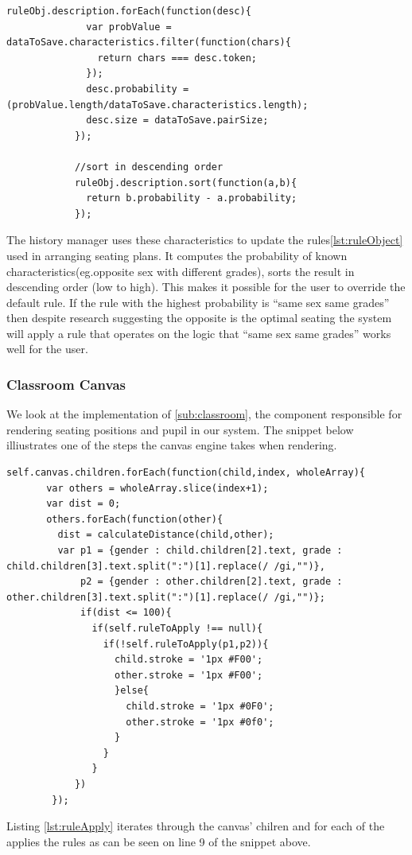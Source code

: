 \begin{lstlisting}[caption={Updates user model with the new rule}, label={lst:updateRule}]
    ruleObj.description.forEach(function(desc){
              var probValue = dataToSave.characteristics.filter(function(chars){
                return chars === desc.token;
              });
              desc.probability = (probValue.length/dataToSave.characteristics.length);
              desc.size = dataToSave.pairSize;
            });

            //sort in descending order
            ruleObj.description.sort(function(a,b){
              return b.probability - a.probability;
            });
\end{lstlisting}
The history manager uses these characteristics to update the rules\ref{lst:ruleObject} used in arranging seating plans. It computes the probability of known characteristics(eg.opposite sex with different grades), sorts the result in descending order (low to high). This makes it possible for the user to override the default rule. If the rule with the highest probability is ``same sex same grades'' then despite research suggesting the opposite is the optimal seating the system will apply a rule that operates on the logic that ``same sex same grades'' works well for the user. 

\subsubsection{Classroom Canvas} \label{sub:classroomCanvas}
We look at the implementation of \ref{sub:classroom}, the component responsible for rendering seating positions and pupil in our system. The snippet below illiustrates one of the steps the canvas engine takes when rendering. 
\begin{lstlisting}[caption={Applies seating rules to individual pupil}, label={lst:ruleApply}]
    self.canvas.children.forEach(function(child,index, wholeArray){
       var others = wholeArray.slice(index+1);
       var dist = 0;
       others.forEach(function(other){
         dist = calculateDistance(child,other);
         var p1 = {gender : child.children[2].text, grade : child.children[3].text.split(":")[1].replace(/ /gi,"")},
             p2 = {gender : other.children[2].text, grade : other.children[3].text.split(":")[1].replace(/ /gi,"")};
             if(dist <= 100){
               if(self.ruleToApply !== null){
                 if(!self.ruleToApply(p1,p2)){
                   child.stroke = '1px #F00';
                   other.stroke = '1px #F00';
                   }else{
                     child.stroke = '1px #0F0';
                     other.stroke = '1px #0f0';
                   }
                 }
               }
            })
        });
\end{lstlisting}
Listing \ref{lst:ruleApply} iterates through the canvas' chilren and for each of the applies the rules as can be seen on line 9 of the snippet above. 

